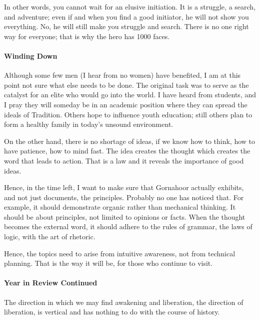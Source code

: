 In other words, you cannot wait for an elusive initiation. It is a struggle, a search, and adventure; even if and when you find a good initiator, he will not show you everything. No, he will still make you struggle and search. There is no one right way for everyone; that is why the hero has 1000 faces.

\paragraph{Winding Down}


Although some few men (I hear from no women) have benefited, I am at this point not sure what else needs to be done. The original task was to serve as the catalyst for an elite who would go into the world. I have heard from students, and I pray they will someday be in an academic position where they can spread the ideals of Tradition. Others hope to influence youth education; still others plan to form a healthy family in today's unsound environment.

On the other hand, there is no shortage of ideas, if we know how to think, how to have patience, how to mind fast. The idea creates the thought which creates the word that leads to action. That is a law and it reveals the importance of good ideas.

Hence, in the time left, I want to make sure that Gornahoor actually exhibits, and not just documents, the principles. Probably no one has noticed that. For example, it should demonstrate organic rather than mechanical thinking. It should be about principles, not limited to opinions or facts. When the thought becomes the external word, it should adhere to the rules of grammar, the laws of logic, with the art of rhetoric.

Hence, the topics need to arise from intuitive awareness, not from technical planning. That is the way it will be, for those who continue to visit.

\paragraph{Year in Review Continued}

\begin{quotex}
The direction in which we may find awakening and liberation, the direction of liberation, is vertical and has nothing to do with the course of history.
\end{quotex}


